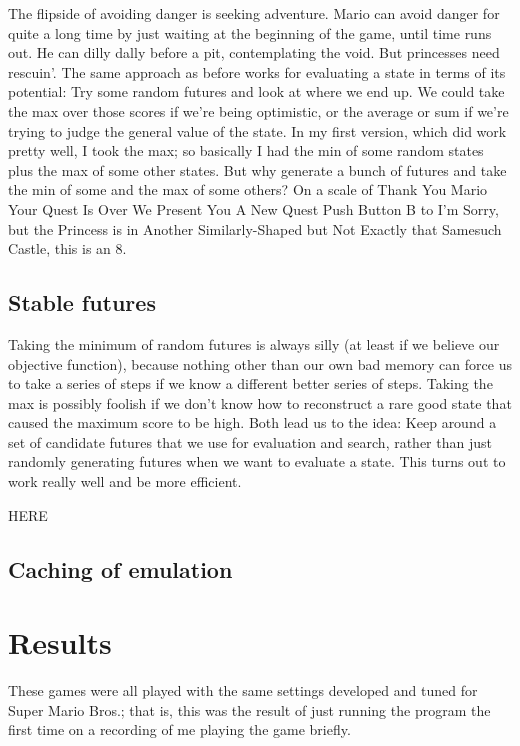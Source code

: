 \documentclass[twocolumn]{article}
\begin{document}
The flipside of avoiding danger is seeking adventure. Mario can avoid
danger for quite a long time by just waiting at the beginning of the
game, until time runs out. He can dilly dally before a pit,
contemplating the void. But princesses need rescuin'. The same
approach as before works for evaluating a state in terms of its
potential: Try some random futures and look at where we end up. We
could take the max over those scores if we're being optimistic, or the
average or sum if we're trying to judge the general value of the
state. In my first version, which did work pretty well, I took the
max; so basically I had the min of some random states plus the max of
some other states. But why generate a bunch of futures and take the
min of some and the max of some others? On a scale of Thank You Mario
Your Quest Is Over We Present You A New Quest Push Button B to I'm
Sorry, but the Princess is in Another Similarly-Shaped but Not Exactly
that Samesuch Castle, this is an 8.

\subsection{Stable futures}

Taking the minimum of random futures is always silly (at least if we
believe our objective function), because nothing other than our own
bad memory can force us to take a series of steps if we know a
different better series of steps. Taking the max is possibly foolish
if we don't know how to reconstruct a rare good state that caused the
maximum score to be high. Both lead us to the idea: Keep around
a set of candidate futures that we use for evaluation and search,
rather than just randomly generating futures when we want to evaluate
a state. This turns out to work really well and be more efficient.

HERE

\subsection{Caching of emulation}



\section{Results}

These games were all played with the same settings developed and tuned
for Super Mario Bros.; that is, this was the result of just running
the program the first time on a recording of me playing the game briefly.
\end{document}
